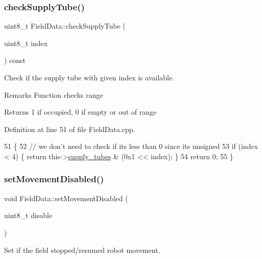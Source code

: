 \subsubsection{\texorpdfstring{check\+Supply\+Tube()}{checkSupplyTube()}}
{\footnotesize\ttfamily uint8\+\_\+t Field\+Data\+::check\+Supply\+Tube (\begin{DoxyParamCaption}\item[{uint8\+\_\+t}]{index }\end{DoxyParamCaption}) const}



Check if the supply tube with given index is available. 

\begin{DoxyRemark}{Remarks}
Function checks range 
\end{DoxyRemark}
\begin{DoxyReturn}{Returns}
1 if occupied, 0 if empty or out of range 
\end{DoxyReturn}


Definition at line 51 of file Field\+Data.\+cpp.


\begin{DoxyCode}
51                                                       \{
52     \textcolor{comment}{// we don't need to check if its less than 0 since its unsigned}
53     \textcolor{keywordflow}{if} (index < 4) \{ \textcolor{keywordflow}{return} this->\hyperlink{class_field_data_a2ac91dcec791870370d578c276993690}{supply\_tubes} & (0x1 << index); \}
54     \textcolor{keywordflow}{return} 0;
55 \}
\end{DoxyCode}
\mbox{\label{class_field_data_a04b6872f909539d5667adfb584b659ed}} 
\subsubsection{\texorpdfstring{set\+Movement\+Disabled()}{setMovementDisabled()}}
{\footnotesize\ttfamily void Field\+Data\+::set\+Movement\+Disabled (\begin{DoxyParamCaption}\item[{uint8\+\_\+t}]{disable }\end{DoxyParamCaption})}



Set if the field stopped/resumed robot movement. 


